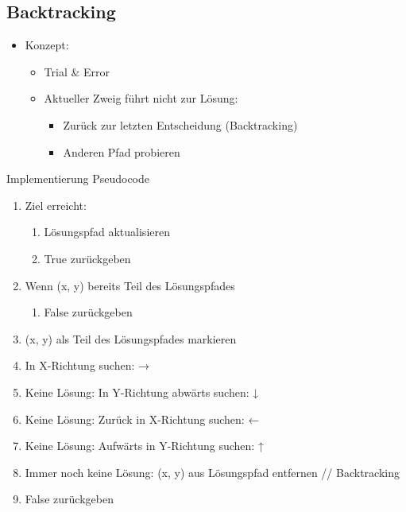 \documentclass[a4paper, landscape, 8pt]{scrartcl}
\begin{document}
\begin{multicols*}{4}
            \subsection{Backtracking}
                \begin{itemize}
                    \item Konzept:
                    \begin{itemize}
                        \item Trial \& Error
                        \item Aktueller Zweig führt nicht zur Lösung:
                        \begin{itemize}
                            \item Zurück zur letzten Entscheidung (Backtracking)
                            \item Anderen Pfad probieren
                        \end{itemize}
                    \end{itemize}
                \end{itemize}
                \textcolor{subsectioncolor}{Implementierung Pseudocode}
                \begin{enumerate}
                    \item Ziel erreicht:
                    \begin{enumerate}
                        \item Lösungspfad aktualisieren
                        \item True zurückgeben
                    \end{enumerate}
                    \item Wenn (x, y) bereits Teil des Lösungspfades
                    \begin{enumerate}
                        \item False zurückgeben
                    \end{enumerate}
                    \item (x, y) als Teil des Lösungspfades markieren
                    \item In X-Richtung suchen: →
                    \item Keine Lösung: In Y-Richtung abwärts suchen: ↓
                    \item Keine Lösung: Zurück in X-Richtung suchen: ←
                    \item Keine Lösung: Aufwärts in Y-Richtung suchen: ↑
                    \item Immer noch keine Lösung: (x, y) aus Lösungspfad entfernen // Backtracking
                    \item False zurückgeben
                \end{enumerate}


\end{multicols*}
\end{document}
